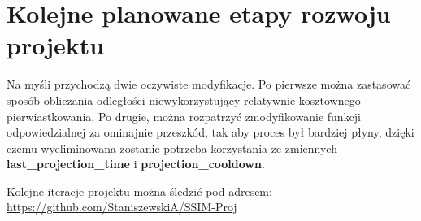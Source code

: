 \documentclass[12pt,a4paper,table]{article}
\begin{document}
    \section{Kolejne planowane etapy rozwoju projektu}
    Na myśli przychodzą dwie oczywiste modyfikacje. Po pierwsze można zastasować sposób obliczania odległości niewykorzystujący relatywnie kosztownego pierwiastkowania, Po drugie, można rozpatrzyć zmodyfikowanie funkcji odpowiedzialnej za ominajnie przeszkód, tak aby proces był bardziej płyny, dzięki czemu wyeliminowana zostanie potrzeba korzystania ze zmiennych \textbf{last\_projection\_time} i \textbf{projection\_cooldown}.

    \vspace{2em}

    Kolejne iteracje projektu można śledzić pod adresem:
    \url{https://github.com/StaniszewskiA/SSIM-Proj}
\end{document}
